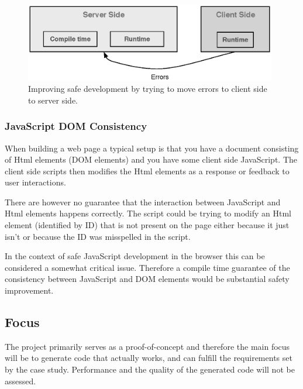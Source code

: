 			\begin{figure}
				\begin{center}
					\centerline{\includegraphics[width=11cm]{resources/images/MovingErrors.eps}}
				\end{center}
				\caption{Improving safe development by trying to move errors to client side to server side.}
				\label{movingErrors}
			\end{figure}

		\subsubsection{JavaScript DOM Consistency} %
		\label{ssub:javascript_dom_consistency}
			When building a web page a typical setup is that you have a document consisting of Html elements (DOM elements) and you have some client side JavaScript. The client side scripts then modifies the Html elements as a response or feedback to user interactions.

			There are however no guarantee that the interaction between JavaScript and Html elements happens correctly. The script could be trying to modify an Html element (identified by ID) that is not present on the page either because it just isn’t or because the ID was misspelled in the script.

			In the context of safe JavaScript development in the browser this can be considered a somewhat critical issue. Therefore a compile time guarantee of the consistency between JavaScript and DOM elements would be substantial safety improvement.







	\subsection{Focus}
		The project primarily serves as a proof-of-concept and therefore the main focus will be to generate code that actually works, and can fulfill the requirements set by the case study. Performance and the quality of the generated code will not be assessed. 

